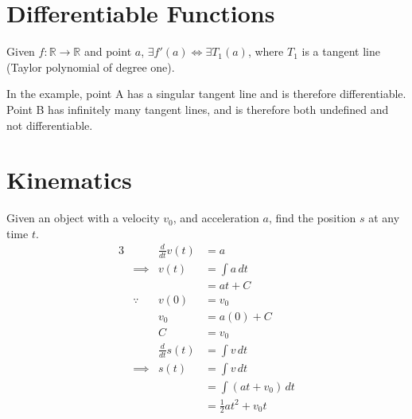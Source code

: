 \documentclass[twoside]{report}
\begin{document}
    \section{Differentiable Functions}
    \begin{definition}[Differentiability]
        Given $f: \mathbb{R} \to \mathbb{R}$ and point $a$, $\exists f'(a) \iff \exists T_{1}(a)$, where $T_1$ is a tangent line (Taylor polynomial of degree one).
        \begin{center}
        \end{center}
        In the example, point A has a singular tangent line and is therefore differentiable. Point B has infinitely many tangent lines, and is therefore both undefined and not differentiable.
    \end{definition}
    \np
    \section{Kinematics}
    \begin{example}
        Given an object with a velocity $v_0$, and acceleration $a$, find the position $s$ at any time $t$.
        \begin{alignat}{3}
            &&\frac{d}{dt}v(t) &= a\\
            &\implies &v(t) &= \int a\,dt\\
            &&&= at + C\\
            &\because & v(0) &= v_{0}\\
            &&v_{0} &= a(0) + C\\
            &&C &= v_{0}\\
            &&\frac{d}{dt}s(t) &= \int v\,dt\\
            &\implies& s(t) &= \int v\,dt\\
            &&&= \int (at + v_{0})\,dt\\
            &&&= \frac{1}{2}a t^{2} + v_{0}t
        \end{alignat}
    \end{example}
\end{document}

